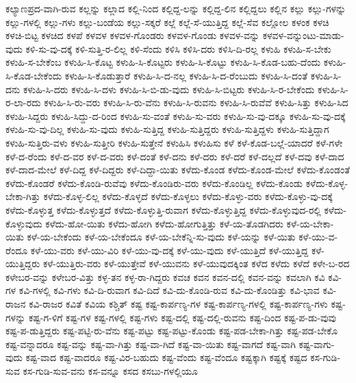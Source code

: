 {ಕಲ್ಯಾಣಪ್ರದ-ವಾಗಿ-ರುವ
ಕಲ್ಲನ್ನು
ಕಲ್ಲಾದ
ಕಲ್ಲಿ-ನಿಂದ
ಕಲ್ಲಿದ್ದ-ಲನ್ನು
ಕಲ್ಲಿದ್ದ-ಲಿನ
ಕಲ್ಲಿದ್ದಲು
ಕಲ್ಲಿನ
ಕಲ್ಲು
ಕಲ್ಲು-ಗಳನ್ನು
ಕಲ್ಲು-ಗಳಲ್ಲಿ
ಕಲ್ಲು-ಗಳು
ಕಲ್ಲು-ಬಂಡೆಯ
ಕಲ್ಲು-ಸಕ್ಕರೆ
ಕಲ್ಲೆ
ಕಲ್ಲೆ-ಸೆ-ಯುತ್ತಿದ್ದ
ಕಲ್ಲೆ-ಸೆವ
ಕಲ್ಲೋಲ
ಕಳಂಕ
ಕಳಚಿ
ಕಳಚಿ-ಬಿಟ್ಟ
ಕಳಚಿದ
ಕಳಪೆ
ಕಳವಳ
ಕಳವಳ-ಗೊಂಡರು
ಕಳವಳ-ಗೊಂಡು
ಕಳವಳ-ವನ್ನು
ಕಳವಳ-ವನ್ನುಂಟು-ಮಾಡು-ವುದು
ಕಳಿ-ಸು-ವು-ದಕ್ಕೆ
ಕಳಿ-ಸುತ್ತಿ-ರ-ಲಿಲ್ಲ
ಕಳಿ-ಸೆಂದು
ಕಳಿಸಿ
ಕಳಿಸಿ-ದರು
ಕಳಿಸಿ-ದಿ-ರಲ್ಲ
ಕಳುಹಿ
ಕಳುಹಿ-ಸ-ಬೇಕು
ಕಳುಹಿ-ಸ-ಬೇಕೆಂಬ
ಕಳುಹಿ-ಸಿ-ಕೊಟ್ಟ
ಕಳುಹಿ-ಸಿ-ಕೊಟ್ಟರು
ಕಳುಹಿ-ಸಿ-ಕೊಟ್ಟು
ಕಳುಹಿ-ಸಿ-ಕೊಡ-ಬಹು-ದೆಂದು
ಕಳುಹಿ-ಸಿ-ಕೊಡ-ಬೇಕೆಂದು
ಕಳುಹಿ-ಸಿ-ಕೊಡುತ್ತಾರೆ
ಕಳುಹಿ-ಸಿ-ದ-ನಲ್ಲ
ಕಳುಹಿ-ಸಿ-ದ-ರೆಂಬುದು
ಕಳುಹಿ-ಸಿ-ದಂತೆ
ಕಳುಹಿ-ಸಿ-ದನು
ಕಳುಹಿ-ಸಿ-ದರು
ಕಳುಹಿ-ಸಿ-ದಳು
ಕಳುಹಿ-ಸಿ-ಬಿ-ಡು-ವುದು
ಕಳುಹಿ-ಸಿ-ಬಿಟ್ಟರು
ಕಳುಹಿ-ಸಿ-ರ-ಬೇಕೆಂದು
ಕಳುಹಿ-ಸಿ-ರ-ಲಾ-ರದು
ಕಳುಹಿ-ಸಿ-ರು-ವರು
ಕಳುಹಿ-ಸಿ-ರು-ವೆನು
ಕಳುಹಿ-ಸಿ-ರುವನು
ಕಳುಹಿ-ಸಿ-ರುವೆವೆ
ಕಳುಹಿ-ಸಿತ್ತು
ಕಳುಹಿ-ಸಿದ
ಕಳುಹಿ-ಸಿದ್ದರು
ಕಳುಹಿ-ಸಿದ್ದು-ದ-ರಿಂದ
ಕಳುಹಿ-ಸು-ವಂತೆ
ಕಳುಹಿ-ಸು-ವರು
ಕಳುಹಿ-ಸು-ವು-ದಕ್ಕೂ
ಕಳುಹಿ-ಸು-ವು-ದಕ್ಕೆ
ಕಳುಹಿ-ಸು-ವು-ದಿಲ್ಲ
ಕಳುಹಿ-ಸು-ವುದು
ಕಳುಹಿ-ಸುತ್ತಿದ್ದ
ಕಳುಹಿ-ಸುತ್ತಿದ್ದರು
ಕಳುಹಿ-ಸುತ್ತಿದ್ದಳು
ಕಳುಹಿ-ಸುತ್ತಿದ್ದಾಗ
ಕಳುಹಿ-ಸುತ್ತಿರು-ವಳು
ಕಳುಹಿ-ಸುತ್ತೀರಿ
ಕಳುಹಿ-ಸುತ್ತೇನೆ
ಕಳುಹಿಸಿ
ಕಳುಹಿಸು
ಕಳೆ
ಕಳೆ-ಕೊಡ-ಬಲ್ಲೆ-ಯಾದರೆ
ಕಳೆ-ಗಳೇ
ಕಳೆ-ದ-ರೆಂದು
ಕಳೆ-ದ-ವರ
ಕಳೆ-ದ-ವರು
ಕಳೆ-ದಂತೆ
ಕಳೆ-ದನು
ಕಳೆ-ದರು
ಕಳೆ-ದರೆ
ಕಳೆ-ದಲ್ಲದೆ
ಕಳೆ-ದವು
ಕಳೆ-ದಾದ
ಕಳೆ-ದಾದ-ಮೇಲೆ
ಕಳೆ-ದಿದ್ದ
ಕಳೆ-ದಿದ್ದರು
ಕಳೆ-ದಿದ್ದಾ-ಯಿತು
ಕಳೆದು-ಕೊಂಡ
ಕಳೆದು-ಕೊಂಡ-ಮೇಲೆ
ಕಳೆದು-ಕೊಂಡಂತೆ
ಕಳೆದು-ಕೊಂಡರೆ
ಕಳೆದು-ಕೊಂಡಿ-ರುವೆವು
ಕಳೆದು-ಕೊಂಡಿರು-ವರು
ಕಳೆದು-ಕೊಂಡಿಲ್ಲ
ಕಳೆದು-ಕೊಂಡು
ಕಳೆದು-ಕೊಳ್ಳ-ಬೇಕಾ-ಗಿತ್ತು
ಕಳೆದು-ಕೊಳ್ಳ-ಲಿಲ್ಲ
ಕಳೆದು-ಕೊಳ್ಳದೆ
ಕಳೆದು-ಕೊಳ್ಳಲು
ಕಳೆದು-ಕೊಳ್ಳು-ವರು
ಕಳೆದು-ಕೊಳ್ಳು-ವು-ದಕ್ಕೆ
ಕಳೆದು-ಕೊಳ್ಳುತ್ತ
ಕಳೆದು-ಕೊಳ್ಳುತ್ತದೆ
ಕಳೆದು-ಕೊಳ್ಳುತ್ತಿ-ರುವಾಗ
ಕಳೆದು-ಕೊಳ್ಳುತ್ತಿದ್ದ
ಕಳೆದು-ಕೊಳ್ಳುವುದ-ರಲ್ಲಿ
ಕಳೆದು-ಕೊಳ್ಳುವುದು
ಕಳೆದು-ಹೋ-ಯಿತು
ಕಳೆದು-ಹೋಗಿ
ಕಳೆದು-ಹೋಗುತ್ತಿತ್ತು
ಕಳೆ-ಯ-ತೊಡಗಿದರು
ಕಳೆ-ಯ-ಬೇಕಾ-ಯಿತು
ಕಳೆ-ಯ-ಬೇಕೆಂದು
ಕಳೆ-ಯ-ಬೇಕೆಂದೂ
ಕಳೆ-ಯ-ಬೇಕೆನ್ನಿ-ಸು-ವುದು
ಕಳೆ-ಯನ್ನು
ಕಳೆ-ಯಿತು
ಕಳೆ-ಯು-ವ-ರೆಂದೂ
ಕಳೆ-ಯು-ವರು
ಕಳೆ-ಯು-ವಿರಿ
ಕಳೆ-ಯು-ವು-ದಕ್ಕೆ
ಕಳೆ-ಯು-ವುದು
ಕಳೆ-ಯುತ್ತಿದೆ
ಕಳೆ-ಯುತ್ತಿದ್ದ
ಕಳೆ-ಯುತ್ತಿದ್ದರು
ಕಳೆ-ಯುತ್ತಿರು-ವರು
ಕಳೆ-ಯುತ್ತೇವೆ
ಕಳೆ-ಯುವನು
ಕಳೆ-ಯುವುದಕ್ಕಿಂತ
ಕಳೆದ
ಕಳೆದು
ಕಳೆದೆ
ಕಳೇ-ಬ-ರದ
ಕಳೇಬರ-ವನ್ನು
ಕಳೇಬರ-ವಿತ್ತು
ಕಳ್ಳ-ತನ
ಕಳ್ಳ-ರಾ-ಗಿದ್ದರು
ಕವಚ
ಕವನ
ಕವನ-ದಲ್ಲಿ
ಕವನ-ವನ್ನು
ಕವಲಾಗಿ
ಕವಿ
ಕವಿ-ಗಳ
ಕವಿ-ಗಳಲ್ಲಿ
ಕವಿ-ಗಳು
ಕವಿ-ದಿ-ರುವಾಗ
ಕವಿ-ದಿದೆ
ಕವಿ-ದು-ಕೊಂಡಿ-ರುವ
ಕವಿ-ದು-ಕೊಂಡಿತ್ತು
ಕವಿ-ಭಾವ
ಕವಿ-ರಾಜನ
ಕವಿ-ರಾಜರ
ಕವಿತೆ
ಕವಿಯ
ಕಶ್ಚಿತ್
ಕಷ್ಟ
ಕಷ್ಟ-ಕಾರ್ಪಣ್ಯ-ಗಳ
ಕಷ್ಟ-ಕಾರ್ಪಣ್ಯ-ಗಳಲ್ಲಿ
ಕಷ್ಟ-ಕಾರ್ಪಣ್ಯ-ಗಳು
ಕಷ್ಟ-ಗಳನ್ನು
ಕಷ್ಟ-ಗ-ಳಿಗೆ
ಕಷ್ಟ-ಗಳ
ಕಷ್ಟ-ಗಳಲ್ಲಿ
ಕಷ್ಟ-ಗಳು
ಕಷ್ಟ-ದಲ್ಲಿ
ಕಷ್ಟ-ದಲ್ಲಿ-ರುವನು
ಕಷ್ಟ-ದಿಂದ
ಕಷ್ಟ-ಪ-ಡು-ವುವು
ಕಷ್ಟ-ಪ-ಡುತ್ತಿದ್ದರು
ಕಷ್ಟ-ಪಟ್ಟಿ-ರು-ವೆನು
ಕಷ್ಟ-ಪಟ್ಟು
ಕಷ್ಟ-ಪಟ್ಟು-ಕೊಂಡು
ಕಷ್ಟ-ಪಡ-ಬೇಕಾ-ಗಿತ್ತು
ಕಷ್ಟ-ಪಡ-ಬೇಕೊ
ಕಷ್ಟ-ವನ್ನಾದರೂ
ಕಷ್ಟ-ವನ್ನು
ಕಷ್ಟ-ವಾ-ಗಿತ್ತು
ಕಷ್ಟ-ವಾ-ಗಿದೆ
ಕಷ್ಟ-ವಾ-ಯಿತು
ಕಷ್ಟ-ವಾಗದೆ
ಕಷ್ಟ-ವಾಗಿ
ಕಷ್ಟ-ವಾಗು-ವುದು
ಕಷ್ಟ-ವಾದ
ಕಷ್ಟ-ವಾದರೂ
ಕಷ್ಟ-ವಿರ-ಬಹುದು
ಕಷ್ಟ-ವೆಂದು
ಕಷ್ಟ-ವೆಂದೂ
ಕಷ್ಟಕ್ಕಾಗಿ
ಕಷ್ಟಕ್ಕೆ
ಕಷ್ಟದ
ಕಸ-ಗುಡಿ-ಸುವ
ಕಸ-ಗುಡಿ-ಸುವ-ವನು
ಕಸ-ವನ್ನೂ
ಕಸದ
ಕಸಬು-ಗಳಲ್ಲಿಯೂ
}
